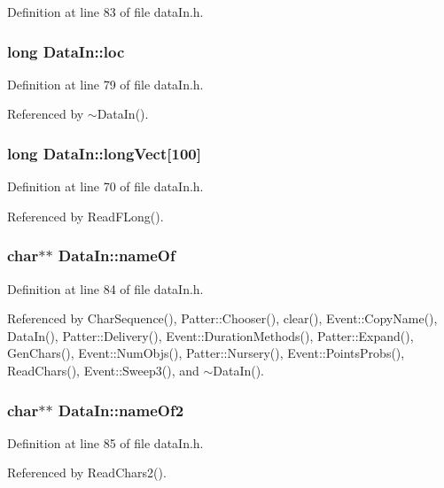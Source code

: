 Definition at line 83 of file data\-In.h.
\subsubsection{\setlength{\rightskip}{0pt plus 5cm}long {\bf Data\-In::loc}}\label{classDataIn_o12}




Definition at line 79 of file data\-In.h.

Referenced by $\sim$Data\-In().
\subsubsection{\setlength{\rightskip}{0pt plus 5cm}long {\bf Data\-In::long\-Vect}[100]}\label{classDataIn_o4}




Definition at line 70 of file data\-In.h.

Referenced by Read\-FLong().
\subsubsection{\setlength{\rightskip}{0pt plus 5cm}char$\ast$$\ast$ {\bf Data\-In::name\-Of}}\label{classDataIn_o16}




Definition at line 84 of file data\-In.h.

Referenced by Char\-Sequence(), Patter::Chooser(), clear(), Event::Copy\-Name(), Data\-In(), Patter::Delivery(), Event::Duration\-Methods(), Patter::Expand(), Gen\-Chars(), Event::Num\-Objs(), Patter::Nursery(), Event::Points\-Probs(), Read\-Chars(), Event::Sweep3(), and $\sim$Data\-In().
\subsubsection{\setlength{\rightskip}{0pt plus 5cm}char$\ast$$\ast$ {\bf Data\-In::name\-Of2}}\label{classDataIn_o17}




Definition at line 85 of file data\-In.h.

Referenced by Read\-Chars2().
